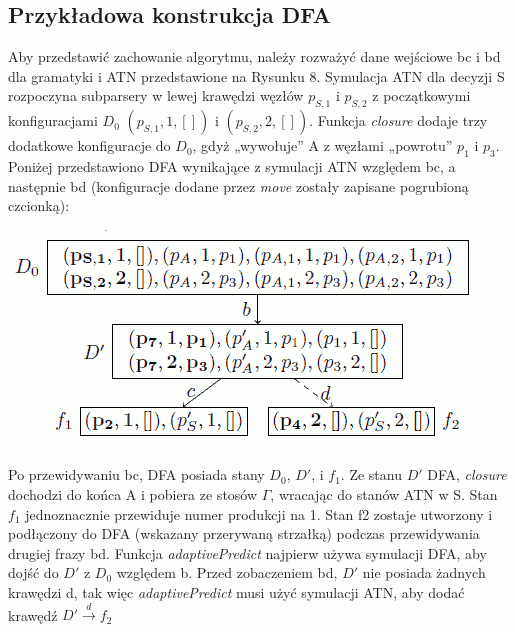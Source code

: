 \subsection{Przykładowa konstrukcja DFA}
Aby przedstawić zachowanie algorytmu, należy rozważyć dane wejściowe bc i bd dla gramatyki
i ATN przedstawione na Rysunku 8.
Symulacja ATN dla decyzji S rozpoczyna subparsery w lewej krawędzi węzłów $p_{S,1}$ i $p_{S,2}$
z początkowymi konfiguracjami $D_0$ $(p_{S,1}, 1, [])$ i $(p_{S,2}, 2, [])$.
Funkcja \textit{closure} dodaje trzy dodatkowe konfiguracje do $D_0$, gdyż „wywołuje” A
z węzłami „powrotu” $p_1$ i $p_3$.
Poniżej przedstawiono DFA wynikające z symulacji ATN względem bc, a następnie bd
(konfiguracje dodane przez \textit{move} zostały zapisane pogrubioną czcionką):
\par
\includegraphics[scale=0.5]{5_4}
\par
Po przewidywaniu bc, DFA posiada stany $D_0$, $D'$, i $f_1$. Ze stanu $D'$ DFA,
\textit{closure} dochodzi do końca A i pobiera ze stosów $\Gamma$, wracając do stanów ATN w S.
Stan $f_1$ jednoznacznie przewiduje numer produkcji na 1. Stan f2 zostaje utworzony i podłączony do DFA
(wskazany przerywaną strzałką) podczas przewidywania drugiej frazy bd.
Funkcja \textit{adaptivePredict} najpierw używa symulacji DFA, aby dojść do $D'$ z $D_0$ względem b.
Przed zobaczeniem bd, $D'$ nie posiada żadnych krawędzi d, tak więc \textit{adaptivePredict}
musi użyć symulacji ATN, aby dodać krawędź $D' \overset{d}{\rightarrow}f_2$

